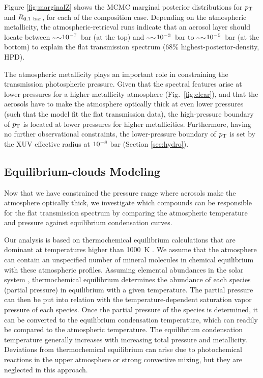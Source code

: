 \documentclass[tighten, times, twocolumn]{aastex61}  %
\let\oldsim=\sim
\renewcommand\sim{\ifmmode\oldsim\else\math{\oldsim}\fi}
\newcommand\ttt[1]{10\sp{#1}}
\renewcommand\math[1]{$#1$}
\let\oldmsp=\sp
\let\oldmsb=\sb
\def\sp#1{\ifmmode
           \oldmsp{#1}%
         \else\strut\raise.85ex\hbox{\scriptsize #1}\fi}
\def\sb#1{\ifmmode
           \oldmsb{#1}%
         \else\strut\raise-.54ex\hbox{\scriptsize #1}\fi}
\begin{document}
Figure \ref{fig:marginalZ} shows the MCMC marginal posterior
distributions for $p\sb{\rm T}$ and $R\sb{0.1\ {\rm bar}}$, for each
of the composition case.
Depending on the atmospheric metallicity,
the atmospheric-retrieval runs indicate that an aerosol layer
should locate between \sim$\ttt{-7}$~bar (at the top) and
\sim$\ttt{-3}$~bar to \sim$\ttt{-5}$~bar (at the bottom)
to explain the flat transmission spectrum (68\%
highest-posterior-density, HPD).

The atmospheric metallicity plays an important role in constraining
the transmission photospheric pressure.
Given that the spectral features arise at lower pressures for a
higher-metallicity atmosphere (Fig.~\ref{fig:clear}), and that the
aerosols have to make the atmosphere optically thick at even lower
pressures (such that the model fit the flat transmission data), the
high-pressure boundary of $p\sb{\rm T}$ is located at lower pressures
for higher metallicities.  Furthermore, having no further
observational constraints, the lower-pressure boundary of $p\sb{\rm
T}$ is set by the XUV effective radius at $\ttt{-8}$ bar
(Section \ref{sec:hydro}).


\subsection{Equilibrium-clouds Modeling}

Now that we have constrained the pressure range where aerosols make
the atmosphere optically thick, we investigate which compounds can be
responsible for the flat transmission spectrum by comparing the
atmospheric temperature and pressure against equilibrium condensation
curves.

Our analysis is based on thermochemical equilibrium calculations that
are dominant at temperatures higher than
1000~K \citep{VisscherEtal2006apjAtmChemistryII,
VisscherEtal2010apjAtmChemistryIII,
MorleyEtal2012apjTYdwarfClouds}.
We assume that the atmosphere can contain an unspecified number of
mineral molecules in chemical equilibrium with these atmospheric
profiles.
Assuming elemental abundances in the solar
system \citep{Lodders2003apjCondensationTemperatures}, thermochemical
equilibrium determines the abundance of each species (partial
pressure) in equilibrium with a given temperature.  The partial pressure
can then be put into relation with the temperature-dependent
saturation vapor pressure of each species.  Once the partial pressure
of the species is determined, it can be converted to the equilibrium
condensation temperature, which can readily be compared to the
atmospheric temperature.  The equilibrium condensation temperature
generally increases with increasing total pressure and metallicity.
Deviations from thermochemical equilibrium can arise due to
photochemical reactions in the upper atmosphere or strong convective
mixing, but they are neglected in this approach.
\end{document}
